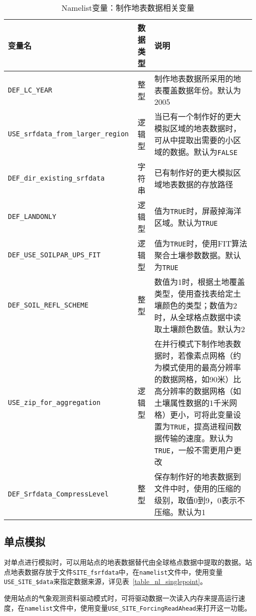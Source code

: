 \begin{table}[!htbp] \small
\caption{Namelist变量：制作地表数据相关变量} \label{table_nl_mksrfdata}
\centering \renewcommand{\arraystretch}{1.2}
\begin{tabular}{lcp{}}
\toprule
\textbf{变量名} & \textbf{数据类型} & \textbf{说明} \\\midrule
\texttt{DEF\_LC\_YEAR} & 整型 & 制作地表数据所采用的地表覆盖数据年份。默认为2005\\
\texttt{USE\_srfdata\_from\_larger\_region} & 逻辑型 & 当已有一个制作好的更大模拟区域的地表数据时，可从中提取出需要的小区域的数据。默认为\texttt{FALSE} \\
\texttt{DEF\_dir\_existing\_srfdata} & 字符串 & 已有制作好的更大模拟区域地表数据的存放路径 \\
\texttt{DEF\_LANDONLY} & 逻辑型 & 值为\texttt{TRUE}时，屏蔽掉海洋区域。默认为\texttt{TRUE} \\
\texttt{DEF\_USE\_SOILPAR\_UPS\_FIT} & 逻辑型 & 值为\texttt{TRUE}时，使用FIT算法聚合土壤参数数据。默认为\texttt{TRUE} \\
\texttt{DEF\_SOIL\_REFL\_SCHEME} & 整型 & 数值为1时，根据土地覆盖类型，使用查找表给定土壤颜色的类型；数值为2时，从全球格点数据中读取土壤颜色数值。默认为2\\
\texttt{USE\_zip\_for\_aggregation} & 逻辑型 & 在并行模式下制作地表数据时，若像素点网格（约为模式使用的最高分辨率的数据网格，如90米）比高分辨率的数据网格（如土壤属性数据的1千米网格）更小，可将此变量设置为\texttt{TRUE}，提高进程间数据传输的速度。默认为\texttt{TRUE}，一般不需更用户更改 \\
\texttt{DEF\_Srfdata\_CompressLevel} & 整型 & 保存制作好的地表数据到文件中时，使用的压缩的级别，取值0到9，0表示不压缩。默认为1\\
\bottomrule
\end{tabular}
\end{table}



\subsection{单点模拟}

对单点进行模拟时，可以用站点的地表数据替代由全球格点数据中提取的数据。站点地表数据存放于文件\texttt{SITE\_fsrfdata}中，在\texttt{namelist}文件中，使用变量\texttt{USE\_SITE\_\allowbreak\$data}来指定数据来源，详见表~\ref{table_nl_singlepoint}。

使用站点的气象观测资料驱动模式时，可将驱动数据一次读入内存来提高运行速度，在\texttt{namelist}文件中，使用变量\texttt{USE\_SITE\_ForcingReadAhead}来打开这一功能。


